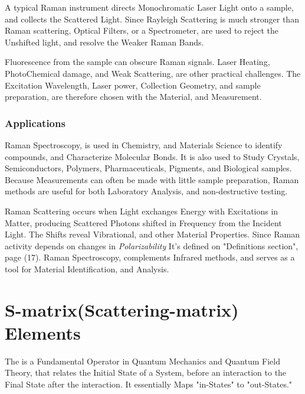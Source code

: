 \documentclass[a4paper, 10pt, onepage]{elegantbook}
\begin{document}
{\noindent

A typical Raman instrument directs Monochromatic Laser Light onto a sample, and collects the Scattered Light. Since 
Rayleigh Scattering is much stronger than Raman scattering, Optical Filters, or a Spectrometer, are used to reject the 
Unshifted light, and resolve the Weaker Raman Bands.  

Fluorescence from the sample can obscure Raman signals. Laser Heating, PhotoChemical damage, and Weak Scattering, are 
other practical challenges. The Excitation Wavelength, Laser power, Collection Geometry, and sample preparation, are 
therefore chosen with the Material, and Measurement.  

\subsection{Applications}

\noindent

Raman Spectroscopy, is used in Chemistry, and Materials Science to identify compounds, and Characterize Molecular 
Bonds. It is also used to Study Crystals, Semiconductors, Polymers, Pharmaceuticals, Pigments, and Biological samples. 
Because Measurements can often be made with
little sample preparation, Raman methods are useful for both Laboratory Analysis, and non-destructive testing.  

\noindent

Raman Scattering occurs when Light exchanges Energy with Excitations in Matter, producing Scattered Photons shifted in 
Frequency from the Incident Light. The Shifts reveal Vibrational, and other Material Properties. Since Raman activity 
depends on changes in \emph{Polarizability} It's defined on "Definitions section", page (17). 
Raman Spectroscopy, complements Infrared
methods, and serves as a tool for Material Identification, and Analysis.  


\newpage

\chapter{S-matrix(Scattering-matrix) Elements}

\noindent

The  is a Fundamental Operator in Quantum Mechanics and Quantum Field Theory, that 
relates the Initial State of a System, before an interaction to the Final State after the interaction. It essentially 
Maps "in-States" to "out-States."  

}
\end{document}
